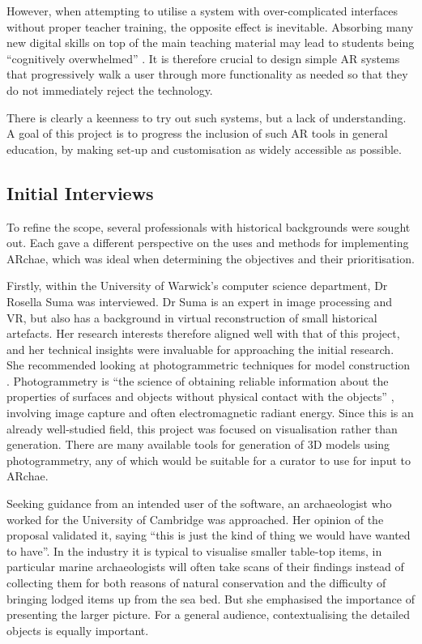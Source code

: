 \documentclass[12pt, a4paper]{article}
\begin{document}
However, when attempting to utilise a system with over-complicated interfaces without proper teacher training, the opposite effect is inevitable. Absorbing many new digital skills on top of the main teaching material may lead to students being “cognitively overwhelmed” \cite{education:overwhelm}. It is therefore crucial to design simple AR systems that progressively walk a user through more functionality as needed so that they do not immediately reject the technology. 

There is clearly a keenness to try out such systems, but a lack of understanding. A goal of this project is to progress the inclusion of such AR tools in general education, by making set-up and customisation as widely accessible as possible. 

\subsection{Initial Interviews}
To refine the scope, several professionals with historical backgrounds were sought out. Each gave a different perspective on the uses and methods for implementing ARchae, which was ideal when determining the objectives and their prioritisation.

Firstly, within the University of Warwick's computer science department, Dr Rosella Suma was interviewed. Dr Suma is an expert in image processing and VR, but also has a background in virtual reconstruction of small historical artefacts. Her research interests therefore aligned well with that of this project, and her technical insights were invaluable for approaching the initial research. She recommended looking at photogrammetric techniques for model construction \cite{interviews:rosellapaper}. Photogrammetry is ``the science of obtaining reliable information about the
properties of surfaces and objects without physical contact with the objects'' \cite{interviews:photogrammetry}, involving image capture and often electromagnetic radiant energy. Since this is an already well-studied field, this project was focused on visualisation rather than generation. There are many available tools for generation of 3D models using photogrammetry, any of which would be suitable for a curator to use for input to ARchae.

Seeking guidance from an intended user of the software, an archaeologist who worked for the University of Cambridge was approached. Her opinion of the proposal validated it, saying ``this is just the kind of thing we would have wanted to have''. In the industry it is typical to visualise smaller table-top items, in particular marine archaeologists will often take scans of their findings instead of collecting them for both reasons of natural conservation and the difficulty of bringing lodged items up from the sea bed. But she emphasised the importance of presenting the larger picture. For a general audience, contextualising the detailed objects is equally important. 
\end{document}
